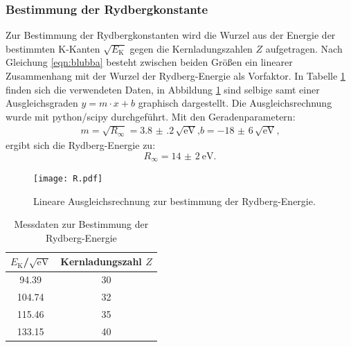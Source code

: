 \subsubsection{Bestimmung der Rydbergkonstante}
Zur Bestimmung der Rydbergkonstanten wird die Wurzel aus der Energie der bestimmten K-Kanten $\sqrt{E_\mathrm{K}}$ gegen die Kernladungszahlen $Z$ aufgetragen.
Nach Gleichung \eqref{eqn:blubba} besteht zwischen beiden Größen ein linearer Zusammenhang mit der Wurzel der Rydberg-Energie als Vorfaktor.
In Tabelle \ref{tab:ryd} finden sich die verwendeten Daten, in Abbildung \ref{fig:ryddi} sind selbige samt einer Ausgleichsgraden $y=m\cdot x+b$ graphisch dargestellt.
Die Ausgleichsrechnung wurde mit python/scipy \cite{scipy} durchgeführt.
Mit den Geradenparametern:
\begin{gather*}
	m=\sqrt{R_{\infty}}=\num{3.8(2)}\,\sqrt{\si{\electronvolt}} \text{,}
	b= \num{-18(6)}\,\sqrt{\si{\electronvolt}} \text{,}
\end{gather*}
ergibt sich die Rydberg-Energie zu:
\begin{equation}
R_{\infty}= \SI{14(2)}{\electronvolt}\text{.}
\end{equation}
\begin{figure}
	\centering
	\texttt{[image: R.pdf]}
	\caption{Lineare Ausgleichsrechnung zur bestimmung der Rydberg-Energie.}
	\label{fig:ryddi}
\end{figure}

\begin{table}
	\centering
	\caption{Messdaten zur Bestimmung der Rydberg-Energie}
	\label{tab:ryd}
\begin{tabular}{cc}
\toprule
$E_\mathrm{K}$/$\sqrt{\si{\electronvolt}}$& Kernladungszahl $Z$ \\
\midrule
94.39& 30 \\
104.74& 32 \\
115.46& 35 \\
133.15 & 40 \\
\bottomrule
\end{tabular}
\end{table}
